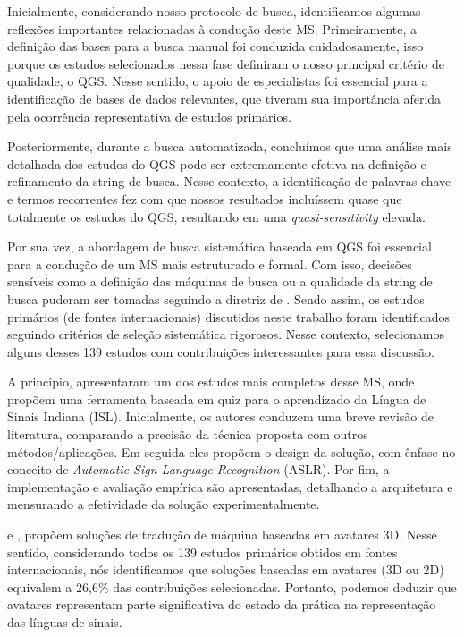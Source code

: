 Inicialmente, considerando nosso protocolo de busca, identificamos algumas reflexões importantes relacionadas à condução deste MS. Primeiramente, a definição das bases para a busca manual foi conduzida cuidadosamente, isso porque os estudos selecionados nessa fase definiram o nosso principal critério de qualidade, o QGS. Nesse sentido, o apoio de especialistas foi essencial para a identificação de bases de dados relevantes, que tiveram sua importância aferida pela ocorrência representativa de estudos primários.

Posteriormente, durante a busca automatizada, concluímos que uma análise mais detalhada dos estudos do QGS pode ser extremamente efetiva na definição e refinamento da string de busca. Nesse contexto, a identificação de palavras chave e termos recorrentes fez com que nossos resultados incluíssem quase que totalmente os estudos do QGS, resultando em uma \textit{quasi-sensitivity} elevada.

Por sua vez, a abordagem de busca sistemática baseada em QGS foi essencial para a condução de um MS mais estruturado e formal. Com isso, decisões sensíveis como a definição das máquinas de busca ou a qualidade da string de busca puderam ser tomadas seguindo a diretriz de . Sendo assim, os estudos primários (de fontes internacionais) discutidos neste trabalho foram identificados seguindo critérios de seleção sistemática rigorosos. Nesse contexto, selecionamos alguns desses 139 estudos com contribuições interessantes para essa discussão.

A  princípio,  apresentaram um dos estudos mais completos desse MS, onde propõem uma ferramenta baseada em quiz para o aprendizado da Língua de Sinais Indiana (ISL). Inicialmente, os autores conduzem uma breve revisão de literatura, comparando a precisão da técnica proposta com outros métodos/aplicações. Em seguida eles propõem o design da solução, com ênfase no conceito de \textit{Automatic Sign Language Recognition} (ASLR). Por fim, a implementação e avaliação empírica são apresentadas, detalhando a arquitetura e mensurando a efetividade da solução experimentalmente.

 e , propõem soluções de tradução de máquina baseadas em avatares 3D. Nesse sentido, considerando todos os 139 estudos primários obtidos em fontes internacionais, nós identificamos que soluções baseadas em avatares (3D ou 2D) equivalem a 26,6\% das contribuições selecionadas. Portanto, podemos deduzir que avatares representam parte significativa do estado da prática na representação das línguas de sinais.

